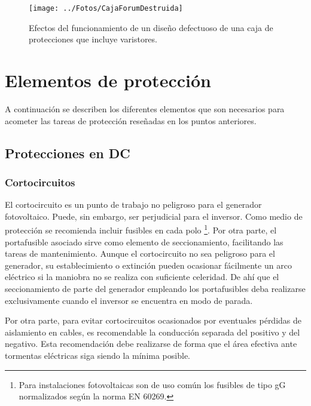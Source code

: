 %
\begin{figure}
\begin{centering}
\texttt{[image: ../Fotos/CajaForumDestruida]}
\end{centering}

\caption{Efectos del funcionamiento de un diseño defectuoso de una caja de
protecciones que incluye varistores.\label{fig:EfectosVaristor}}

\end{figure}



\section{Elementos de protección}

A continuación se describen los diferentes elementos que son necesarios
para acometer las tareas de protección reseñadas en los puntos anteriores.


\subsection{Protecciones en DC}


\subsubsection{Cortocircuitos}

El cortocircuito es un punto de trabajo no peligroso para el generador
fotovoltaico. Puede, sin embargo, ser perjudicial para el inversor.
Como medio de protección se recomienda incluir fusibles en cada polo%
\footnote{Para instalaciones fotovoltaicas son de uso común los fusibles de
tipo gG normalizados según la norma EN 60269.%
}. Por otra parte, el portafusible asociado sirve como elemento de
seccionamiento, facilitando las tareas de mantenimiento. Aunque el
cortocircuito no sea peligroso para el generador, su establecimiento
o extinción pueden ocasionar fácilmente un arco eléctrico si la maniobra
no se realiza con suficiente celeridad. De ahí que el seccionamiento
de parte del generador empleando los portafusibles deba realizarse
exclusivamente cuando el inversor se encuentra en modo de parada. 

Por otra parte, para evitar cortocircuitos ocasionados por eventuales
pérdidas de aislamiento en cables, es recomendable la conducción separada
del positivo y del negativo. Esta recomendación debe realizarse de
forma que el área efectiva ante tormentas eléctricas siga siendo la
mínima posible.

